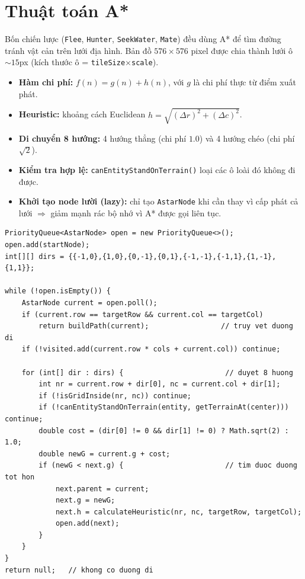 \documentclass[12pt,a4paper]{report}
\newcommand{\code}[1]{\texttt{\small #1}}
\begin{document}
\section{Thuật toán A*}

Bốn chiến lược (\code{Flee}, \code{Hunter}, \code{SeekWater}, \code{Mate}) đều dùng A* để tìm đường tránh vật cản trên lưới địa hình. Bản đồ $576\times576$ pixel được chia thành lưới ô $\sim15$px (kích thước ô = \code{tileSize}$\times$\code{scale}).

\begin{itemize}[leftmargin=1.5em]
    \item \textbf{Hàm chi phí:} $f(n) = g(n) + h(n)$, với $g$ là chi phí thực từ điểm xuất phát.
    \item \textbf{Heuristic:} khoảng cách Euclidean $h = \sqrt{(\Delta r)^2 + (\Delta c)^2}$.
    \item \textbf{Di chuyển 8 hướng:} 4 hướng thẳng (chi phí $1.0$) và 4 hướng chéo (chi phí $\sqrt{2}$).
    \item \textbf{Kiểm tra hợp lệ:} \code{canEntityStandOnTerrain()} loại các ô loài đó không đi được.
    \item \textbf{Khởi tạo node lười (lazy):} chỉ tạo \code{AstarNode} khi cần thay vì cấp phát cả lưới $\Rightarrow$ giảm mạnh rác bộ nhớ vì A* được gọi liên tục.
\end{itemize}

\begin{lstlisting}[caption={Lõi A* trong WorldMap.java}]
PriorityQueue<AstarNode> open = new PriorityQueue<>();
open.add(startNode);
int[][] dirs = {{-1,0},{1,0},{0,-1},{0,1},{-1,-1},{-1,1},{1,-1},{1,1}};

while (!open.isEmpty()) {
    AstarNode current = open.poll();
    if (current.row == targetRow && current.col == targetCol)
        return buildPath(current);                 // truy vet duong di
    if (!visited.add(current.row * cols + current.col)) continue;

    for (int[] dir : dirs) {                        // duyet 8 huong
        int nr = current.row + dir[0], nc = current.col + dir[1];
        if (!isGridInside(nr, nc)) continue;
        if (!canEntityStandOnTerrain(entity, getTerrainAt(center))) continue;
        double cost = (dir[0] != 0 && dir[1] != 0) ? Math.sqrt(2) : 1.0;
        double newG = current.g + cost;
        if (newG < next.g) {                        // tim duoc duong tot hon
            next.parent = current;
            next.g = newG;
            next.h = calculateHeuristic(nr, nc, targetRow, targetCol);
            open.add(next);
        }
    }
}
return null;   // khong co duong di
\end{lstlisting}
\end{document}

